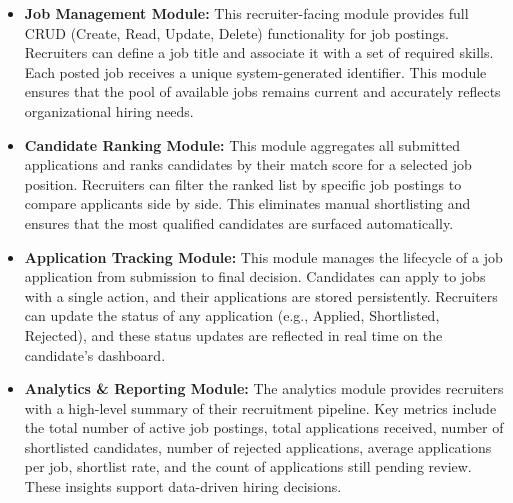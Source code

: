 \begin{itemize}
    \item \textbf{Job Management Module:} This recruiter-facing module provides full CRUD (Create, Read, Update, Delete) functionality for job postings. Recruiters can define a job title and associate it with a set of required skills. Each posted job receives a unique system-generated identifier. This module ensures that the pool of available jobs remains current and accurately reflects organizational hiring needs.
    
    \item \textbf{Candidate Ranking Module:} This module aggregates all submitted applications and ranks candidates by their match score for a selected job position. Recruiters can filter the ranked list by specific job postings to compare applicants side by side. This eliminates manual shortlisting and ensures that the most qualified candidates are surfaced automatically.
    
    \item \textbf{Application Tracking Module:} This module manages the lifecycle of a job application from submission to final decision. Candidates can apply to jobs with a single action, and their applications are stored persistently. Recruiters can update the status of any application (e.g., Applied, Shortlisted, Rejected), and these status updates are reflected in real time on the candidate's dashboard.
    
    \item \textbf{Analytics \& Reporting Module:} The analytics module provides recruiters with a high-level summary of their recruitment pipeline. Key metrics include the total number of active job postings, total applications received, number of shortlisted candidates, number of rejected applications, average applications per job, shortlist rate, and the count of applications still pending review. These insights support data-driven hiring decisions.
    
\end{itemize}
